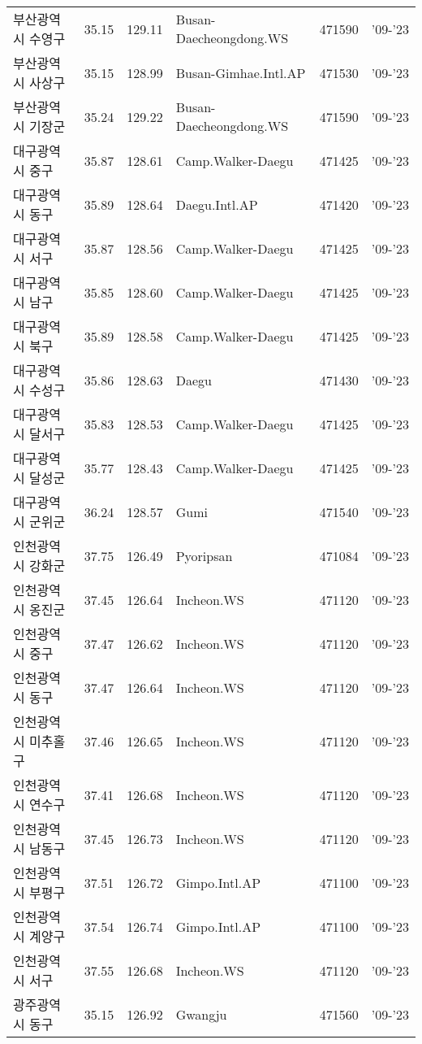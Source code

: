 \begin{longtable}{lcclcc}
  부산광역시 수영구 & 35.15 & 129.11 & Busan-Daecheongdong.WS & 471590 & '09-'23 \\
  부산광역시 사상구 & 35.15 & 128.99 & Busan-Gimhae.Intl.AP & 471530 & '09-'23 \\
  부산광역시 기장군 & 35.24 & 129.22 & Busan-Daecheongdong.WS & 471590 & '09-'23 \\
  대구광역시 중구 & 35.87 & 128.61 & Camp.Walker-Daegu & 471425 & '09-'23 \\
  대구광역시 동구 & 35.89 & 128.64 & Daegu.Intl.AP & 471420 & '09-'23 \\
  대구광역시 서구 & 35.87 & 128.56 & Camp.Walker-Daegu & 471425 & '09-'23 \\
  대구광역시 남구 & 35.85 & 128.60 & Camp.Walker-Daegu & 471425 & '09-'23 \\
  대구광역시 북구 & 35.89 & 128.58 & Camp.Walker-Daegu & 471425 & '09-'23 \\
  대구광역시 수성구 & 35.86 & 128.63 & Daegu & 471430 & '09-'23 \\
  대구광역시 달서구 & 35.83 & 128.53 & Camp.Walker-Daegu & 471425 & '09-'23 \\
  대구광역시 달성군 & 35.77 & 128.43 & Camp.Walker-Daegu & 471425 & '09-'23 \\
  대구광역시 군위군 & 36.24 & 128.57 & Gumi & 471540 & '09-'23 \\
  인천광역시 강화군 & 37.75 & 126.49 & Pyoripsan & 471084 & '09-'23 \\
  인천광역시 옹진군 & 37.45 & 126.64 & Incheon.WS & 471120 & '09-'23 \\
  인천광역시 중구 & 37.47 & 126.62 & Incheon.WS & 471120 & '09-'23 \\
  인천광역시 동구 & 37.47 & 126.64 & Incheon.WS & 471120 & '09-'23 \\
  인천광역시 미추홀구 & 37.46 & 126.65 & Incheon.WS & 471120 & '09-'23 \\
  인천광역시 연수구 & 37.41 & 126.68 & Incheon.WS & 471120 & '09-'23 \\
  인천광역시 남동구 & 37.45 & 126.73 & Incheon.WS & 471120 & '09-'23 \\
  인천광역시 부평구 & 37.51 & 126.72 & Gimpo.Intl.AP & 471100 & '09-'23 \\
  인천광역시 계양구 & 37.54 & 126.74 & Gimpo.Intl.AP & 471100 & '09-'23 \\
  인천광역시 서구 & 37.55 & 126.68 & Incheon.WS & 471120 & '09-'23 \\
  광주광역시 동구 & 35.15 & 126.92 & Gwangju & 471560 & '09-'23 \\

\end{longtable}
